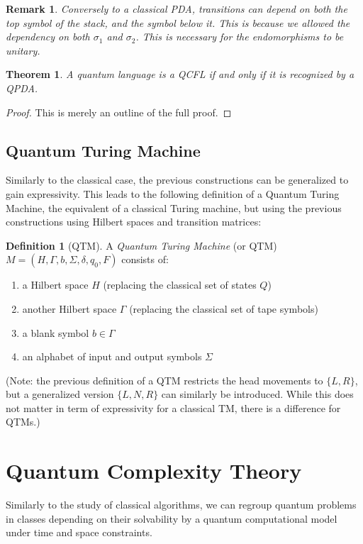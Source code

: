 \documentclass[12pt,a4paper]{article}
\theoremstyle{plain}
\newtheorem*{theorem}{Theorem}
\newtheorem*{remark}{Remark}
\theoremstyle{definition}
\newtheorem*{definition}{Definition}
\begin{document}
\begin{remark}
    Conversely to a classical PDA, transitions can depend on both the top symbol of the stack, and the symbol below it. This is because we allowed the dependency on both $\sigma_1$ and $\sigma_2$. This is necessary for the endomorphisms to be unitary. 
\end{remark}

\begin{theorem}
    A quantum language is a QCFL if and only if it is recognized by a QPDA.
\end{theorem}

\begin{proof}
    This is merely an outline of the full proof\cite{quantum-automata-grammars}.
\end{proof}

\subsection{Quantum Turing Machine}
Similarly to the classical case, the previous constructions can be generalized to gain expressivity. This leads to the following definition of a Quantum Turing Machine\cite{qtm-circuits}\cite{qc-theory-bernstein}, the equivalent of a classical Turing machine, but using the previous constructions using Hilbert spaces and transition matrices:

\begin{definition}[QTM] A \emph{Quantum Turing Machine} (or QTM) $M = (H, \Gamma, b, \Sigma, \delta, q_0, F)$ consists of:
\begin{enumerate}[label=--, noitemsep]
    \item a Hilbert space $H$ (replacing the classical set of states $Q$)
    \item another Hilbert space $\Gamma$ (replacing the classical set of tape symbols)
    \item a blank symbol $b\in \Gamma$
    \item an alphabet of input and output symbols $\Sigma$
\end{enumerate}
    
(Note: the previous definition of a QTM restricts the head movements to $\{L, R\}$, but a generalized version $\{L, N, R\}$ can similarly be introduced. While this does not matter in term of expressivity for a classical TM, there is a difference for QTMs.)

\end{definition}

\section{Quantum Complexity Theory}
Similarly to the study of classical algorithms, we can regroup quantum problems in classes depending on their solvability by a quantum computational model under time and space constraints. 
\end{document}
